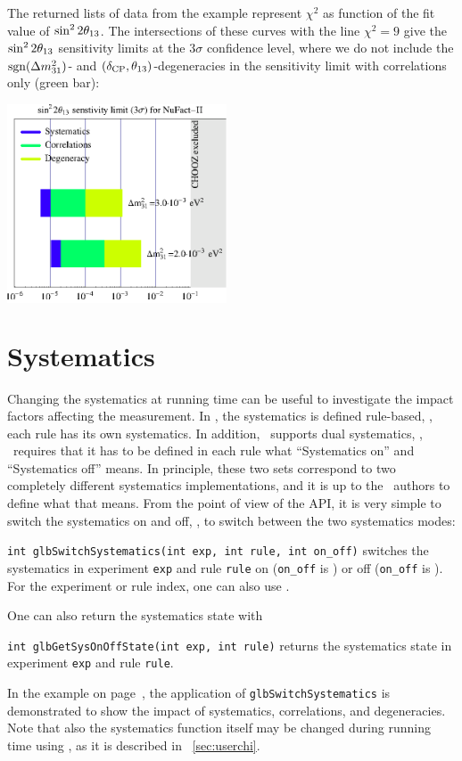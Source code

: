 {The returned lists of data from the example represent $\chi^2$ 
as function of the fit value of $\sin^2 2 \theta_{13}$. The intersections of these
curves with the line $\chi^2 = 9$ give the $\sin^2 2 \theta_{13}$ sensitivity
limits at the $3 \sigma$ confidence level, where we do not include the
 $\mathrm{sgn}(\Delta m_{31}^2)$- and $(\delta_{\mathrm{CP}},\theta_{13})$-degeneracies in the sensitivity limit with correlations only (green bar):
\begin{center}
\colorbox{white}{\includegraphics[width=6.5cm]{barsex}}
\end{center}
}

\section{Systematics}
\label{sec:systematics}

Changing the systematics at running time can be useful to investigate
the impact factors affecting the measurement.
In \GLOBES , the systematics is defined rule-based, \ie, each rule
has its own systematics. 
In addition, \GLOBES\ supports dual systematics, \ie, \AEDL\ requires that it has to be
defined in each rule what ``Systematics on'' and ``Systematics off'' means.
In principle, these two sets correspond to two completely different systematics
implementations, and it is up to the \AEDL\ authors to define what that means.
From the point of view of the API, it is very simple to switch the systematics on and off, \ie,
to switch between the two systematics modes:
\begin{function}
{\tt int glbSwitchSystematics(int exp, int rule, int on\_off)}
switches the systematics in experiment {\tt exp} and rule {\tt rule}
on ({\tt on\_off} is ) or off ({\tt on\_off} is ). For the experiment or
rule index, one can also use . 
\end{function}
One can also return the systematics state with
\begin{function}
{\tt int glbGetSysOnOffState(int exp, int rule)}
returns the systematics state in experiment {\tt exp} and rule {\tt rule}. 
\end{function}
In the example on page~\pageref{ex:barcharts}, the application of
{\tt glbSwitchSystematics} is demonstrated to show the impact of
systematics, correlations, and degeneracies.
Note that also the systematics function itself may be changed during running time
using , as it is described in \Sec~\ref{sec:userchi}.

